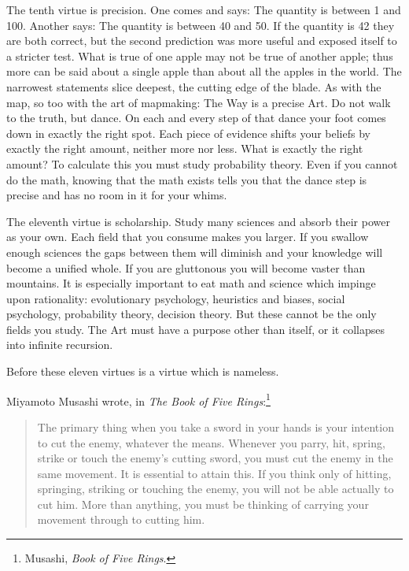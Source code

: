  The tenth virtue is precision. One comes and says: The quantity is
between 1 and 100. Another says: The quantity is between 40 and 50. If
the quantity is 42 they are both correct, but the second prediction was
more useful and exposed itself to a stricter test. What is true of one
apple may not be true of another apple; thus more can be said about a
single apple than about all the apples in the world. The narrowest
statements slice deepest, the cutting edge of the blade. As with the
map, so too with the art of mapmaking: The Way is a precise Art. Do not
walk to the truth, but dance. On each and every step of that dance your
foot comes down in exactly the right spot. Each piece of evidence
shifts your beliefs by exactly the right amount, neither more nor less.
What is exactly the right amount? To calculate this you must study
probability theory. Even if you cannot do the math, knowing that the
math exists tells you that the dance step is precise and has no room in
it for your whims.


 The eleventh virtue is scholarship. Study many sciences and absorb
their power as your own. Each field that you consume makes you larger.
If you swallow enough sciences the gaps between them will diminish and
your knowledge will become a unified whole. If you are gluttonous you
will become vaster than mountains. It is especially important to eat
math and science which impinge upon rationality: evolutionary
psychology, heuristics and biases, social psychology, probability
theory, decision theory. But these cannot be the only fields you study.
The Art must have a purpose other than itself, or it collapses into
infinite recursion.


 Before these eleven virtues is a virtue which is nameless.

{
 Miyamoto Musashi wrote, in \textit{The Book of Five
Rings}:\footnote{Musashi, \textit{Book of Five Rings}.}}

\begin{quote}
{
 The primary thing when you take a sword in your hands is your
intention to cut the enemy, whatever the means. Whenever you parry,
hit, spring, strike or touch the enemy's cutting sword,
you must cut the enemy in the same movement. It is essential to attain
this. If you think only of hitting, springing, striking or touching the
enemy, you will not be able actually to cut him. More than anything,
you must be thinking of carrying your movement through to cutting him.}
\end{quote}



